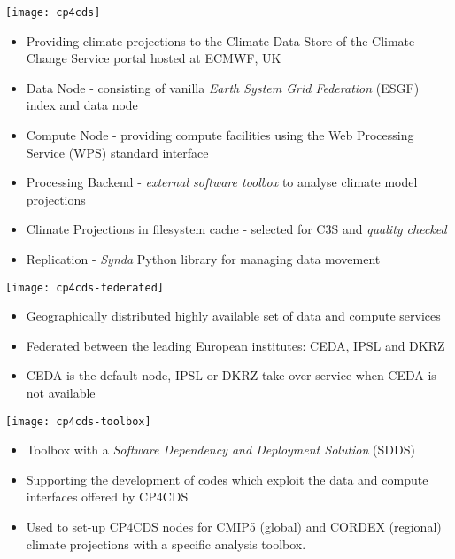 \documentclass[portrait,a0paper,fontscale=0.4]{baposter} %
\newcommand{\compresslist}{%
\setlength{\itemsep}{1pt}%
\setlength{\parskip}{0pt}%
\setlength{\parsep}{0pt}%
}
\begin{document}
\begin{poster}
{   \begin{minipage}{0.3\textwidth}
     \texttt{[image: cp4cds]}
   \end{minipage}
   \begin{minipage}{0.7\textwidth}
     \begin{itemize}\compresslist
       \item Providing climate projections to the Climate Data Store of the
        Climate Change Service portal hosted at ECMWF, UK
       \item Data Node - consisting of vanilla \emph{Earth System Grid Federation} (ESGF) index and data node
       \item Compute Node - providing compute facilities using the Web Processing Service (WPS) standard interface
       \item Processing Backend - \emph{external software toolbox} to analyse climate model projections
       \item Climate Projections in filesystem cache - selected for C3S and \emph{quality checked}
       \item Replication - \emph{Synda} Python library for managing data movement
     \end{itemize}
     \vspace{2em}
  \end{minipage}
  \begin{minipage}{0.3\textwidth}
    \texttt{[image: cp4cds-federated]}
  \end{minipage}
  \begin{minipage}{0.7\textwidth}
    \begin{itemize}\compresslist
      \item Geographically distributed highly available set of data and compute services
      \item Federated between the leading European institutes: CEDA, IPSL and DKRZ
      \item CEDA is the default node, IPSL or DKRZ take over service when CEDA is not available
    \end{itemize}
    \vspace{2em}
  \end{minipage}
  \begin{minipage}{0.3\textwidth}
    \texttt{[image: cp4cds-toolbox]}
  \end{minipage}
  \begin{minipage}{0.7\textwidth}
    \begin{itemize}\compresslist
      \item Toolbox with a \emph{Software Dependency and Deployment Solution} (SDDS)
      \item Supporting the development of codes which exploit the data and compute interfaces offered by CP4CDS
      \item Used to set-up CP4CDS nodes for CMIP5 (global) and CORDEX (regional) climate projections with
        a specific analysis toolbox.
    \end{itemize}
    \vspace{2em}
  \end{minipage}
 }


\end{poster}
\end{document}
